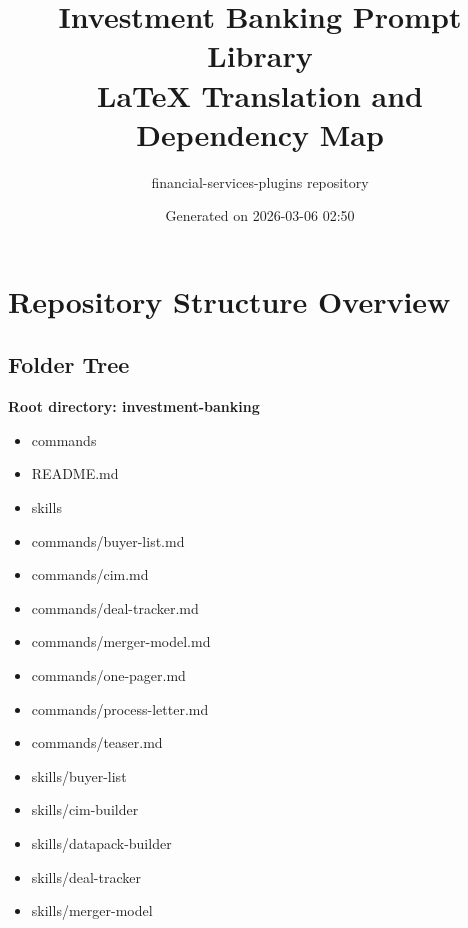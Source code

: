 \documentclass[11pt]{article}
\title{Investment Banking Prompt Library\\LaTeX Translation and Dependency Map}
\author{financial-services-plugins repository}
\date{Generated on 2026-03-06 02:50 }
\begin{document}
\maketitle
\tableofcontents
\newpage

\section{Repository Structure Overview}

\subsection{Folder Tree}
\textbf{Root directory: investment-banking}
\begin{itemize}[leftmargin=*,itemsep=1pt,topsep=2pt]
\item \hspace*{0.0em}commands
\item \hspace*{0.0em}README.md
\item \hspace*{0.0em}skills
\item \hspace*{0.9em}commands/buyer-list.md
\item \hspace*{0.9em}commands/cim.md
\item \hspace*{0.9em}commands/deal-tracker.md
\item \hspace*{0.9em}commands/merger-model.md
\item \hspace*{0.9em}commands/one-pager.md
\item \hspace*{0.9em}commands/process-letter.md
\item \hspace*{0.9em}commands/teaser.md
\item \hspace*{0.9em}skills/buyer-list
\item \hspace*{0.9em}skills/cim-builder
\item \hspace*{0.9em}skills/datapack-builder
\item \hspace*{0.9em}skills/deal-tracker
\item \hspace*{0.9em}skills/merger-model

\end{itemize}
\end{document}
